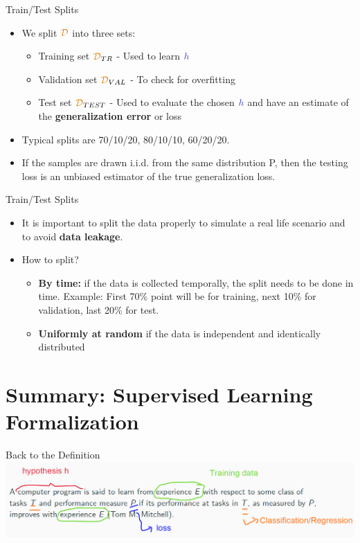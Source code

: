 \documentclass[aspectratio=169,10pt]{beamer}
\begin{document}
\begin{frame}{Train/Test Splits}
	\begin{itemize}
		\item We split $\trainset$ into three sets:
		\begin{itemize}
			\item Training set $\trainset_{TR}$ - Used to learn $\hypothesis$
			\item Validation set $\trainset_{VAL}$ - To check for overfitting
			\item Test set  $\trainset_{TEST}$ - Used to evaluate the chosen $\hypothesis$ and have an estimate of the \textbf{generalization error} or loss
		\end{itemize}
		\vspace{1cm}
		\item Typical splits are 70/10/20, 80/10/10, 60/20/20.
		
		\item 	If the samples are drawn i.i.d. from the same distribution P, then the testing loss is an unbiased estimator of the true generalization loss.
	\end{itemize}	 
\end{frame}

\begin{frame}{Train/Test Splits}
		\begin{itemize}
		\item It is important to split the data properly to simulate a real life scenario and to avoid \textbf{data leakage}.
		\vspace{1cm}
	\item How to split?
	\begin{itemize}
		\item \textbf{By time:} if the data is collected temporally, the split needs to be done in time. \alert{Example:} First 70\% point will be for training, next 10\% for validation, last 20\% for test.
		\vspace{0.3cm}
		\item \textbf{Uniformly at random} if the data is independent and  identically distributed 
	\end{itemize} 
\end{itemize} 
\end{frame}

\section{Summary: Supervised Learning Formalization}
\begin{frame}{Back to the Definition}
	\centering
	\includegraphics[width=\textwidth, clip]{images/setup_2}
\end{frame}
\end{document}
